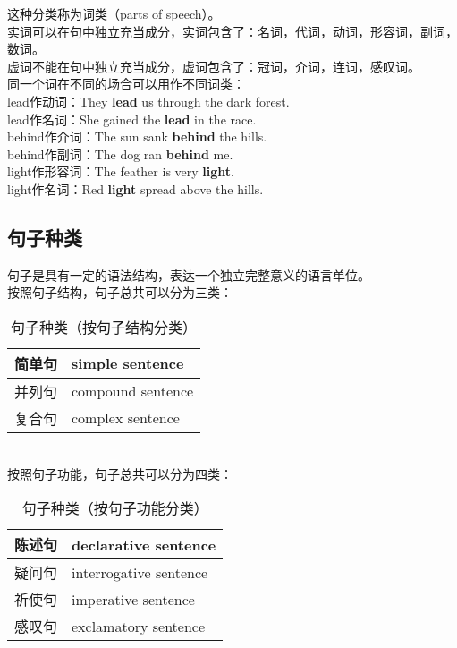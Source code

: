 \documentclass[UTF8]{ctexart}
\begin{document}
    这种分类称为词类（parts of speech）。\\[3mm]
    实词可以在句中独立充当成分，实词包含了：名词，代词，动词，形容词，副词，数词。\\[3mm]
    虚词不能在句中独立充当成分，虚词包含了：冠词，介词，连词，感叹词。\\[8mm]
    同一个词在不同的场合可以用作不同词类：\\[4mm]
    lead作动词：They \textbf{lead} us through the dark forest.\\[3mm]
    lead作名词：She gained the \textbf{lead} in the race.\\[5mm]
    behind作介词：The sun sank \textbf{behind} the hills.\\[3mm]
    behind作副词：The dog ran \textbf{behind} me.\\[5mm]
    light作形容词：The feather is very \textbf{light}.\\[3mm]
    light作名词：Red \textbf{light} spread above the hills.


\newpage

\subsection{句子种类}
    句子是具有一定的语法结构，表达一个独立完整意义的语言单位。\\[2mm]
    按照句子结构，句子总共可以分为三类：
    \begin{table}[h!]
        \begin{center}
            \begin{tabular}{p{60pt}|p{120pt}}
                \hline
                简单句&simple sentence\\ \hline
                并列句&compound sentence\\ \hline
                复合句&complex sentence\\ \hline
            \end{tabular}
            \caption{句子种类（按句子结构分类）}
        \end{center}
    \end{table}\\
    按照句子功能，句子总共可以分为四类：
    \begin{table}[h!]
        \begin{center}
            \begin{tabular}{p{60pt}|p{120pt}}
                \hline
                陈述句&declarative sentence\\ \hline
                疑问句&interrogative sentence\\ \hline
                祈使句&imperative sentence\\ \hline
                感叹句&exclamatory sentence\\ \hline
            \end{tabular}
            \caption{句子种类（按句子功能分类）}
        \end{center}
    \end{table}
\end{document}
